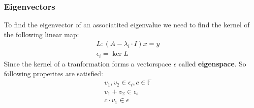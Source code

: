 \documentclass{book}
\begin{document}
\subsubsection{Eigenvectors}
To find the eigenvector of an associatited eigenvalue we need to find the kernel of the following linear map:
\begin{align*}
    L:  (A - \lambda_i \cdot I) x = y \\
    \epsilon_i = \ker L
\end{align*}
Since the kernel of a tranformation forms a vectorspace  \( \epsilon \) called \textbf{eigenspace}. So following properites are satisfied:
\begin{align*}
    v_1, v_2 \in \epsilon_i, c \in \mathbb{F} \\
    v_1 + v_2 \in \epsilon_i                  \\
    c \cdot v_1 \in \epsilon                  \\
\end{align*}
\end{document}
